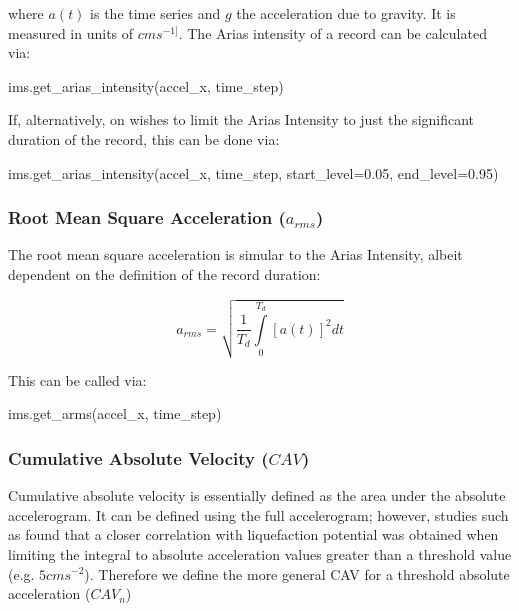 \noindent where $a \left( t \right)$ is the time series and $g$ the acceleration due to gravity. It is measured in units of $cm s^{-1]}$. The Arias intensity of a record can be calculated via:

\begin{python}
ims.get_arias_intensity(accel_x,
                        time_step)
\end{python}

If, alternatively, on wishes to limit the Arias Intensity to just the significant duration of the record, this can be done via:

\begin{python}
ims.get_arias_intensity(accel_x,
                        time_step,
                        start_level=0.05,
                        end_level=0.95)
\end{python}

\subsubsection{Root Mean Square Acceleration ($a_{rms}$)}

The root mean square acceleration is simular to the Arias Intensity, albeit dependent on the definition of the record duration: 

\begin{equation}
a_{rms} =\sqrt{\frac{1}{T_d}\int\limits_0^{T_d} \left[ {a \left( t \right)}\right]^2 dt}
\end{equation}

This can be called via:

\begin{python}
ims.get_arms(accel_x, time_step)
\end{python}


\subsubsection{Cumulative Absolute Velocity ($CAV$)}

Cumulative absolute velocity is essentially defined as the area under the absolute accelerogram. It can be defined using the full accelerogram; however, studies such as \textcite{KramerMitchell2006} found that a closer correlation with liquefaction potential was obtained when limiting the integral to absolute acceleration values greater than a threshold value (e.g. $5 cm s^{-2}$). Therefore we define the more general CAV for a threshold absolute acceleration ($CAV_n$)


